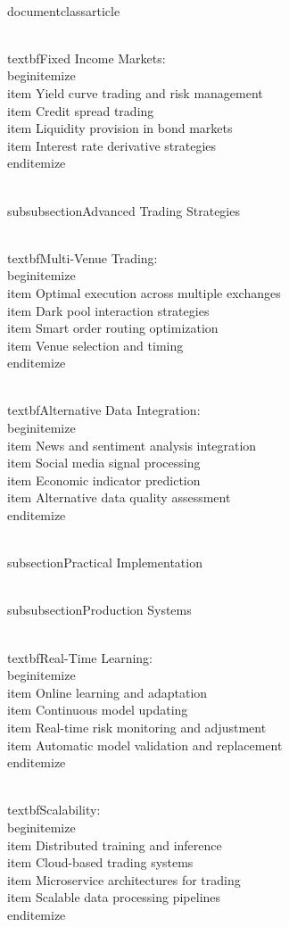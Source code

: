 \\documentclass{article}
\begin{document}
\\textbf{Fixed Income Markets}:
\\begin{itemize}
\\item Yield curve trading and risk management
\\item Credit spread trading
\\item Liquidity provision in bond markets
\\item Interest rate derivative strategies
\\end{itemize}

\\subsubsection{Advanced Trading Strategies}

\\textbf{Multi-Venue Trading}:
\\begin{itemize}
\\item Optimal execution across multiple exchanges
\\item Dark pool interaction strategies
\\item Smart order routing optimization
\\item Venue selection and timing
\\end{itemize}

\\textbf{Alternative Data Integration}:
\\begin{itemize}
\\item News and sentiment analysis integration
\\item Social media signal processing
\\item Economic indicator prediction
\\item Alternative data quality assessment
\\end{itemize}

\\subsection{Practical Implementation}

\\subsubsection{Production Systems}

\\textbf{Real-Time Learning}:
\\begin{itemize}
\\item Online learning and adaptation
\\item Continuous model updating
\\item Real-time risk monitoring and adjustment
\\item Automatic model validation and replacement
\\end{itemize}

\\textbf{Scalability}:
\\begin{itemize}
\\item Distributed training and inference
\\item Cloud-based trading systems
\\item Microservice architectures for trading
\\item Scalable data processing pipelines
\\end{itemize}
\end{document}
